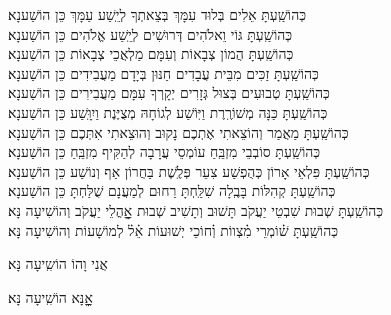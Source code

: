 \documentclass[twoside, openany, parskip=half, 11pt]{book}
\begin{document}
\begin{small}
כְּהוֹשַֽׁעְתָּ אֵלִים בְּלוּד עִמָּךְ בְּצֵאתְךָ לְיֵֽשַׁע עַמָּךְ \hfill כֵּן הוֹשַׁענָא׃ \\
כְּהוֹשַֽׁעְתָּ גּוֹי וֵאלֹהִים דְּרוּשִׁים לְיֵֽשַׁע אֱלֹהִים \hfill כֵּן הוֹשַׁענָא׃ \\
כְּהוֹשַֽׁעְתָּ הֲמוֹן צְבָאוֹת וְעִמָּם מַלְאֲכֵי צְבָאוֹת \hfill כֵּן הוֹשַׁענָא׃ \\
כְּהוֹשַֽׁעְתָּ זַכִּים מִבֵּית עֲבָדִים חַנּוּן בְּיָדָם מַעֲבִידִים \hfill כֵּן הוֹשַׁענָא׃ \\
כְּהוֹשַֽׁעְתָּ טְבוּעִים בְּצוּל גְּזָרִים יְקָרְךָ עִמָּם מַעֲבִירִים \hfill כֵּן הוֹשַׁענָא׃ \\
כְּהוֹשַֽׁעְתָּ כַּנָּה מְשׁוֹרֶֽרֶת וַיּֽוֹשַׁע לְגוֹחָהּ מְצֻיֶּנֶת וַיִוָּֽשַׁע \hfill כֵּן הוֹשַׁענָא׃ \\
כְּהוֹשַֽׁעְתָּ מַאֲמַר וְהוֹצֵאתִי אֶתְכֶם נָקוּב וְהוּצֵאתִי אִתְּכֶם \hfill כֵּן הוֹשַׁענָא׃\\
כְּהוֹשַֽׁעְתָּ סוֹבְבֵי מִזְבֵּֽחַ עוֹמְסֵי עֲרָבָה לְהַקִּיף מִזְבֵּֽחַ \hfill כֵּן הוֹשַׁענָא׃ \\
כְּהוֹשַֽׁעְתָּ פִּלְאֵי אָרוֹן כְּהֻפְשַׁע צִעֵר פְּלֶֽשֶׁת בַּחֲרוֹן אַף וְנוֹשַׁע \hfill כֵּן הוֹשַׁענָא׃ \\
כְּהוֹשַֽׁעְתָּ קְהִלּוֹת בָּבֶֽלָה שִׁלַּֽחְתָּ רַחוּם לְמַעֲנָם שֻׁלַּחְתָּ \hfill כֵּן הוֹשַׁענָא׃\\
כְּהוֹשַֽׁעְתָּ שְׁבוּת שִׁבְטֵי יַעֲקֹב תָּשׁוּב וְתָשִׁיב שְׁבוּת אׇׇׇׇׇהֳלֵי יַעֲקֹב \hfill וְהוֹשִׁיעָה נָּא׃\\
כְּהוֹשַֽׁעְתָּ שׁ֗וֹמְרֵי מִ֗צְווֹת וְ֗חוֹכֵי יְשׁוּעוֹת אֵ֗ל֗ לְמוֹשָׁעוֹת \hfill וְהוֹשִׁיעָה נָּא׃

\end{small}

\begin{large}
\chazzan
אֲנִי וָהוֹ הוֹשִֽיעָה נָּא׃

\shatzvkahal
אׇׇׇׇׇנָּא הוֹשִֽׁיעָה נָּא׃

\end{large}
\end{document}
